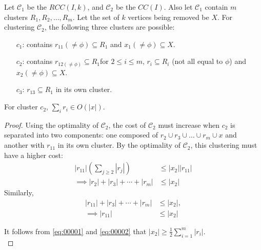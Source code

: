 Let $\mathcal{C}_1$ be the $RCC(I,k)$, and $\mathcal{C}_2$ be the $CC(I)$. Also let $\mathcal{C}_1$ contain $m$ clusters $R_1, R_2, \dots, R_m$. Let the set of $k$ vertices being removed be $X$. For clustering $\mathcal{C}_2$, the following three clusters are possible:
\begin{enumerate}
    \item[$c_1$:] contains $r_{11}(\neq \phi)\subseteq R_1$ and $x_1(\neq \phi) \subseteq X$.
    \item[$c_2$:] contains $r_{12(\neq \phi)}\subseteq R_1$for $2\le i \le m$, $r_i \subseteq R_i$ (not all equal to $\phi$) and $x_2(\neq \phi) \subseteq X$.
    \item[$c_3$:] $r_{13}\subseteq R_1$ in its own cluster.
\end{enumerate}
\begin{lemma}\label{lemma-d1}
For cluster $c_2$, $\sum_{i}r_i \in O(|x|)$.
\end{lemma}
\begin{proof}
Using the optimality of $\mathcal{C}_2$, the cost of $\mathcal{C}_2$ must increase when $c_2$ is separated into two components: one composed of $r_2 \cup r_3 \cup \dots \cup r_m \cup x $ and another with $r_{11}$ in its own cluster. By the optimality of $\mathcal{C}_2$, this clustering must have a higher cost:
    \begin{align}
        |r_{11}| \left( \sum_{j \ge 2} |r_j| \right) &\leq |x_2| |r_{11}| \nonumber\\
        \implies |r_2| + |r_3| + \cdots + |r_m| &\leq |x_2| \label{eq:00001}
    \end{align}
    Similarly,
    \begin{align}
        |r_{11}| + |r_3| + \cdots + |r_m| &\leq |x_2|, \nonumber\\
        \implies |r_{11}| &\leq |x_2| \label{eq:00002}
    \end{align}

    It follows from \eqref{eq:00001} and \eqref{eq:00002} that $|x_2| \ge \frac12 \sum_{i=1}^{m} |r_i|$.\\
\end{proof}

